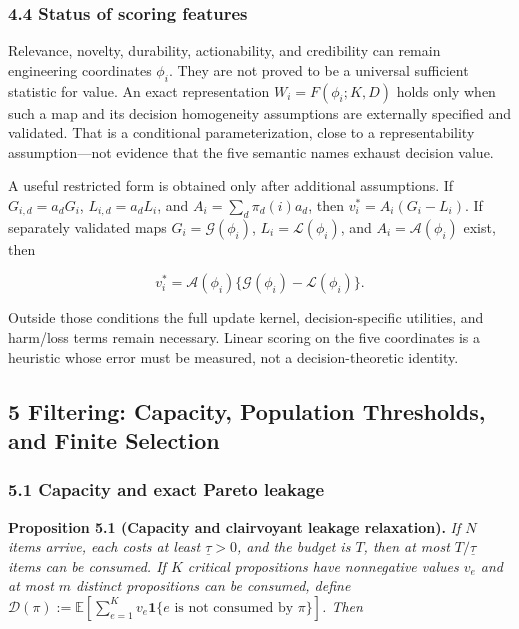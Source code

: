 \documentclass[
  11pt]{article}
\begin{document}
\subsubsection{4.4 Status of scoring
features}\label{status-of-scoring-features}

Relevance, novelty, durability, actionability, and credibility can
remain engineering coordinates \(\phi_i\). They are not proved to be a
universal sufficient statistic for value. An exact representation
\(W_i=F(\phi_i;K,D)\) holds only when such a map and its decision
homogeneity assumptions are externally specified and validated. That is
a conditional parameterization, close to a representability
assumption---not evidence that the five semantic names exhaust decision
value.

A useful restricted form is obtained only after additional assumptions.
If \(G_{i,d}=a_dG_i\), \(L_{i,d}=a_dL_i\), and
\(A_i=\sum_d\pi_d(i)a_d\), then \(v_i^*=A_i(G_i-L_i)\). If separately
validated maps \(G_i=\mathcal G(\phi_i)\), \(L_i=\mathcal L(\phi_i)\),
and \(A_i=\mathcal A(\phi_i)\) exist, then

\[v_i^*=\mathcal A(\phi_i)\{\mathcal G(\phi_i)-\mathcal L(\phi_i)\}.\]

Outside those conditions the full update kernel, decision-specific
utilities, and harm/loss terms remain necessary. Linear scoring on the
five coordinates is a heuristic whose error must be measured, not a
decision-theoretic identity.

\subsection{5 Filtering: Capacity, Population Thresholds, and Finite
Selection}\label{filtering-capacity-population-thresholds-and-finite-selection}

\subsubsection{5.1 Capacity and exact Pareto
leakage}\label{capacity-and-exact-pareto-leakage}

\textbf{Proposition 5.1 (Capacity and clairvoyant leakage relaxation).}
\emph{If \(N\) items arrive, each costs at least \(\underline\tau>0\),
and the budget is \(T\), then at most \(T/\underline\tau\) items can be
consumed. If \(K\) critical propositions have nonnegative values \(v_e\)
and at most \(m\) distinct propositions can be consumed, define
\(\mathcal D(\pi):=\mathbb E[\sum_{e=1}^Kv_e\mathbf 1\{e\text{ is not consumed by }\pi\}]\).
Then}
\end{document}
